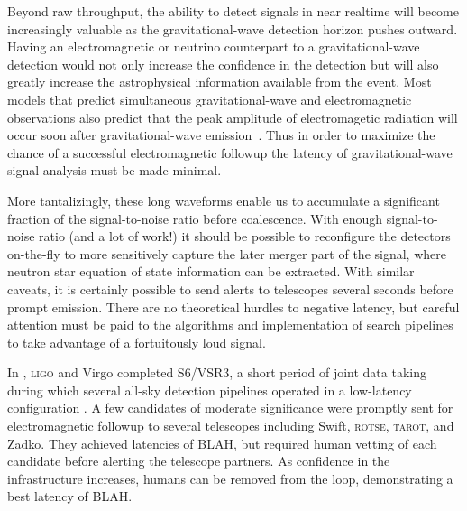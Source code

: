 Beyond raw throughput, the ability to detect signals in near realtime will
become increasingly valuable as the gravitational-wave detection horizon pushes
outward. Having an electromagnetic or neutrino counterpart to a
gravitational-wave detection would not only increase the confidence in the
detection but will also greatly increase the astrophysical information
available from the event. Most models that predict simultaneous
gravitational-wave and electromagnetic observations also predict that the peak
amplitude of electromagetic radiation will occur soon after gravitational-wave
emission~\cite{sylvestre2003}. Thus in order to maximize the chance of a
successful electromagnetic followup the latency of gravitational-wave signal
analysis must be made minimal.

More tantalizingly, these long waveforms enable us to accumulate a significant
fraction of the signal-to-noise ratio before coalescence. With enough
signal-to-noise ratio (and a lot of work!) it should be possible to reconfigure
the detectors on-the-fly to more sensitively capture the later merger part of
the signal, where neutron star equation of state information can be extracted.
With similar caveats, it is certainly possible to send alerts to telescopes
several seconds before prompt emission. There are no theoretical hurdles to
negative latency, but careful attention must be paid to the algorithms and
implementation of search pipelines to take advantage of a fortuitously loud
signal.

In , \textsc{ligo} and Virgo completed S6/VSR3,
a short period of
joint data taking during which several all-sky detection pipelines operated in
a low-latency configuration \citeneeded. A few candidates of moderate
significance were promptly sent for electromagnetic followup \citeneeded{} to
several telescopes including Swift, \textsc{rotse}, \textsc{tarot}, and Zadko.
They achieved latencies of BLAH, but required human vetting of each candidate
before alerting the telescope partners. As confidence in the infrastructure
increases, humans can be removed from the loop, demonstrating a best latency
of BLAH.

